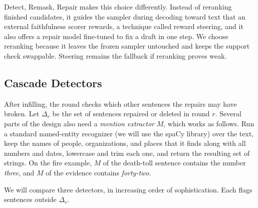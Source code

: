 \documentclass[]{paper}
\begin{document}
Detect, Remask, Repair makes this choice differently. Instead of reranking finished candidates, it guides the sampler during decoding toward text that an external faithfulness scorer rewards, a technique called reward steering, and it also offers a repair model fine-tuned to fix a draft in one step. We choose reranking because it leaves the frozen sampler untouched and keeps the support check swappable. Steering remains the fallback if reranking proves weak.

\subsection{Cascade Detectors}
\label{sec:detectors}

After infilling, the round checks which other sentences the repairs may have broken. Let $\Delta_r$ be the set of sentences repaired or deleted in round $r$. Several parts of the design also need a \emph{mention extractor} $M$, which works as follows. Run a standard named-entity recognizer (we will use the spaCy library) over the text, keep the names of people, organizations, and places that it finds along with all numbers and dates, lowercase and trim each one, and return the resulting set of strings. On the fire example, $M$ of the death-toll sentence contains the number \emph{three}, and $M$ of the evidence contains \emph{forty-two}.

We will compare three detectors, in increasing order of sophistication. Each flags sentences outside $\Delta_r$.
\end{document}
